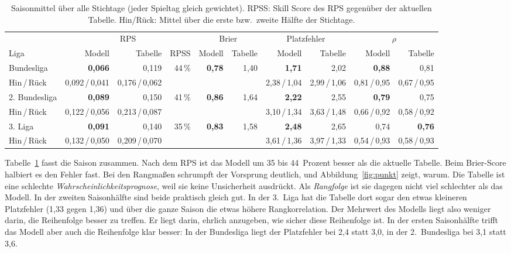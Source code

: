\documentclass[11pt,a4paper,parskip=half,numbers=noenddot]{scrartcl}
\newcommand{\abb}[1]{Abbildung~\ref{#1}}
\newcommand{\tab}[1]{Tabelle~\ref{#1}}
\begin{document}
\begin{table}[!htbp]
\centering\footnotesize\setlength{\tabcolsep}{3.5pt}
\caption{Saisonmittel über alle Stichtage (jeder Spieltag gleich gewichtet).
RPSS: Skill Score des RPS gegenüber der aktuellen Tabelle. Hin/Rück: Mittel
über die erste bzw.\ zweite Hälfte der Stichtage.}\label{tab:saison}
\begin{adjustbox}{max width=\textwidth}
\begin{tabular}{@{}l rrr rr rr rr@{}}
\toprule
& \multicolumn{3}{c}{RPS} & \multicolumn{2}{c}{Brier} & \multicolumn{2}{c}{Platzfehler} & \multicolumn{2}{c}{$\rho$} \\
\cmidrule(lr){2-4}\cmidrule(lr){5-6}\cmidrule(lr){7-8}\cmidrule(l){9-10}
Liga & Modell & Tabelle & RPSS & Modell & Tabelle & Modell & Tabelle & Modell & Tabelle \\
\midrule
Bundesliga    & \textbf{0,066} & 0,119 & 44\,\% & \textbf{0,78} & 1,40 & \textbf{1,71} & 2,02 & \textbf{0,88} & 0,81 \\
\quad Hin\,/\,Rück & 0,092\,/\,0,041 & 0,176\,/\,0,062 & & & & 2,38\,/\,1,04 & 2,99\,/\,1,06 & 0,81\,/\,0,95 & 0,67\,/\,0,95 \\
2. Bundesliga & \textbf{0,089} & 0,150 & 41\,\% & \textbf{0,86} & 1,64 & \textbf{2,22} & 2,55 & \textbf{0,79} & 0,75 \\
\quad Hin\,/\,Rück & 0,122\,/\,0,056 & 0,213\,/\,0,087 & & & & 3,10\,/\,1,34 & 3,63\,/\,1,48 & 0,66\,/\,0,92 & 0,58\,/\,0,92 \\
3. Liga       & \textbf{0,091} & 0,140 & 35\,\% & \textbf{0,83} & 1,58 & \textbf{2,48} & 2,65 & 0,74 & \textbf{0,76} \\
\quad Hin\,/\,Rück & 0,132\,/\,0,050 & 0,209\,/\,0,070 & & & & 3,61\,/\,1,36 & 3,97\,/\,1,33 & 0,54\,/\,0,93 & 0,58\,/\,0,93 \\
\bottomrule
\end{tabular}
\end{adjustbox}
\end{table}

\tab{tab:saison} fasst die Saison zusammen. Nach dem RPS ist das Modell um
35 bis 44~Prozent besser als die aktuelle Tabelle. Beim Brier-Score halbiert
es den Fehler fast. Bei den Rangmaßen schrumpft der Vorsprung deutlich, und
\abb{fig:punkt} zeigt, warum. Die Tabelle ist eine schlechte
\emph{Wahrscheinlichkeitsprognose}, weil sie keine Unsicherheit ausdrückt.
Als \emph{Rangfolge} ist sie dagegen nicht viel schlechter als das Modell.
In der zweiten Saisonhälfte sind beide praktisch gleich gut. In der 3.~Liga
hat die Tabelle dort sogar den etwas kleineren Platzfehler (1,33 gegen 1,36)
und über die ganze Saison die etwas höhere Rangkorrelation. Der Mehrwert des
Modells liegt also weniger darin, die Reihenfolge besser zu treffen. Er
liegt darin, ehrlich anzugeben, wie sicher diese Reihenfolge ist. In der
ersten Saisonhälfte trifft das Modell aber auch die Reihenfolge klar besser:
In der Bundesliga liegt der Platzfehler bei 2,4 statt 3,0, in der
2.~Bundesliga bei 3,1 statt 3,6.
\end{document}
